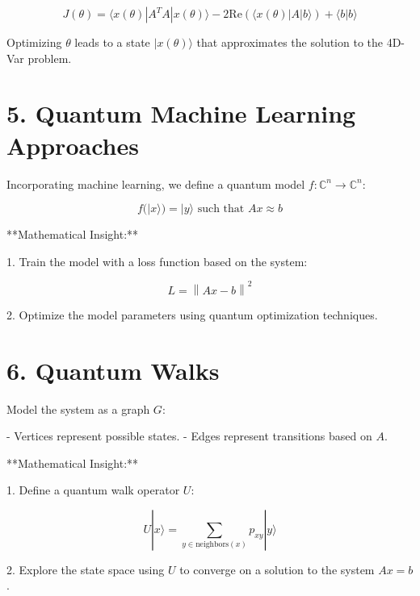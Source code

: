 \documentclass{article}
\begin{document}
\[
J(\theta) = \langle x(\theta)| A^TA |x(\theta)\rangle - 2\text{Re}\left(\langle x(\theta)| A |b\rangle\right) + \langle b|b\rangle
\]

Optimizing \( \theta \) leads to a state \( |x(\theta)\rangle \) that approximates the solution to the 4D-Var problem.

\section{5. Quantum Machine Learning Approaches}

Incorporating machine learning, we define a quantum model \( f: \mathbb{C}^n \rightarrow \mathbb{C}^n \):

\[
f(|x\rangle) = |y\rangle \text{ such that } Ax \approx b
\]

**Mathematical Insight:**

1. Train the model with a loss function based on the system:

\[
L = \left\| Ax - b \right\|^2
\]

2. Optimize the model parameters using quantum optimization techniques.

\section{6. Quantum Walks}

Model the system as a graph \( G \):

- Vertices represent possible states.
- Edges represent transitions based on \( A \).

**Mathematical Insight:**

1. Define a quantum walk operator \( U \):

\[
U |x\rangle = \sum_{y \in \text{neighbors}(x)} p_{xy} |y\rangle
\]

2. Explore the state space using \( U \) to converge on a solution to the system \( Ax = b \).
\end{document}
